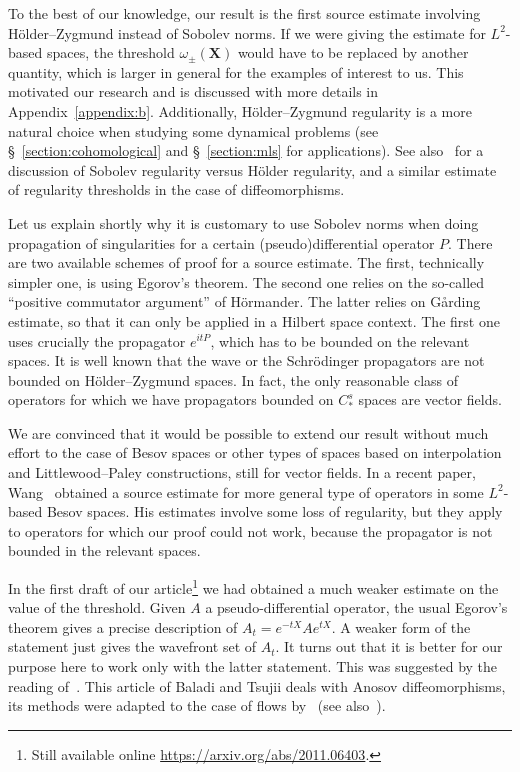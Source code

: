 \documentclass[10pt]{amsart}
\theoremstyle{definition}\newtheorem{defi}[theo]{Definition}\newtheorem{rema}[theo]{Remark}\newtheorem{exam}[theo]{Example}\newtheorem{exem}[theo]{Example}\newtheorem{nota}[theo]{Notation}
\newcommand{\X}{\mathbf{X}}
\begin{document}
To the best of our knowledge, our result is the first source estimate involving H\"older--Zygmund instead of Sobolev norms. If we were giving the estimate for $L^2$-based spaces, the threshold $\omega_{\pm}(\X)$ would have to be replaced by another quantity, which is larger in general for the examples of interest to us. This motivated our research and is discussed with more details in Appendix~\ref{appendix:b}. Additionally, H\"older--Zygmund regularity is a more natural choice when studying some dynamical problems (see \S~\ref{section:cohomological} and \S~\ref{section:mls} for applications). See also~\cite{dlLLave-2001} for a discussion of Sobolev regularity versus H\"older regularity, and a similar estimate of regularity thresholds in the case of diffeomorphisms.

Let us explain shortly why it is customary to use Sobolev norms when doing propagation of singularities for a certain (pseudo)differential operator $P$. There are two available schemes of proof for a source estimate. The first, technically simpler one, is using Egorov's theorem. The second one relies on the so-called ``positive commutator argument'' of H\"ormander. The latter relies on G{\r a}rding estimate, so that it can only be applied in a Hilbert space context. The first one uses crucially the propagator $e^{itP}$, which has to be bounded on the relevant spaces. It is well known that the wave or the Schr\"odinger propagators are not bounded on H\"older--Zygmund spaces. In fact, the only reasonable class of operators for which we have propagators bounded on $C^s_\ast$ spaces are vector fields.

We are convinced that it would be possible to extend our result without much effort to the case of Besov spaces or other types of spaces based on interpolation and Littlewood--Paley constructions, still for vector fields. In a recent paper, Wang~\cite{Wang-20} obtained a source estimate for more general type of operators in some $L^2$-based Besov spaces. His estimates involve some loss of regularity, but they apply to operators for which our proof could not work, because the propagator is not bounded in the relevant spaces.

In the first draft of our article\footnote{Still available online \url{https://arxiv.org/abs/2011.06403}.} we had obtained a much weaker estimate on the value of the threshold. Given $A$ a pseudo-differential operator, the usual Egorov's theorem gives a precise description of $A_t = e^{-tX}Ae^{tX}$. A weaker form of the statement just gives the wavefront set of $A_t$. It turns out that it is better for our purpose here to work only with the latter statement. This was suggested by the reading of~\cite{Baladi-Tsujii-07}. This article of Baladi and Tsujii deals with Anosov diffeomorphisms, its methods were adapted to the case of flows by~\cite{Adam-19} (see also~\cite{Adam-Baladi-2021}).
\end{document}
